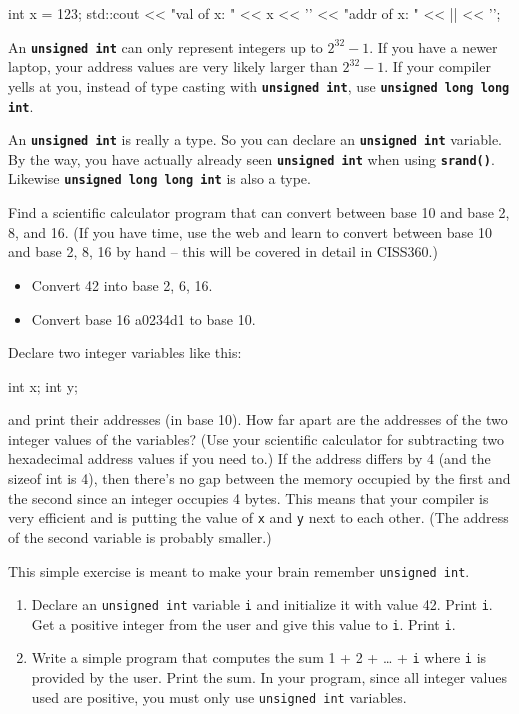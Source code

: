 \begin{consolethree}[escapeinside=||]
int x = 123;
std::cout << "val of x: " << x
          << '\n' << "addr of x: "
          << ||
          << '\n';
\end{consolethree}
An \texttt{\textbf{unsigned int}} can only represent integers up to $2^{32} - 1$. If you have a newer laptop, your address values are very likely larger than $2^{32} - 1$. If your compiler yells at you, instead of type casting with \texttt{\textbf{unsigned int}}, use \texttt{\textbf{unsigned long long int}}.

An \texttt{\textbf{unsigned int}} is really a type. So you can declare an \texttt{\textbf{unsigned int}} variable. By the way, you have actually already seen \texttt{\textbf{unsigned int}} when using \texttt{\textbf{srand()}}. Likewise \texttt{\textbf{unsigned long long int}} is also a type.

\begin{ex} Find a scientific calculator program that can convert between base 10 and base 2, 8, and 16. (If you have time, use the web and learn to convert between base 10 and base 2, 8, 16 by hand -- this will be covered in detail in CISS360.)
\begin{itemize}
\item
  Convert 42 into base 2, 6, 16.
\item
  Convert base 16 a0234d1 to base 10.
\end{itemize}
\end{ex}

\begin{ex}
Declare two integer variables like this:
\begin{consolethree}[escapeinside=||]
int x;
int y;
\end{consolethree}
and print their addresses (in base 10). How far apart are the addresses of the two integer values of the variables? (Use your scientific calculator for subtracting two hexadecimal address values if you need to.) If the address differs by 4 (and the sizeof int is 4), then there's no gap between the memory occupied by the first and the second since an integer occupies 4 bytes. This means that your compiler is very efficient and is putting the value of \texttt{x} and \texttt{y} next to each other. (The address of the second variable is probably smaller.)
\end{ex}
\begin{ex}
This simple exercise is meant to make your brain remember \texttt{unsigned int}.

\begin{enumerate}
\item
  Declare an \texttt{unsigned int} variable \texttt{i} and initialize it
  with value 42. Print \texttt{i}. Get a positive integer from the user
  and give this value to \texttt{i}. Print \texttt{i}.
\item
  Write a simple program that computes the sum 1 + 2 + \ldots{} +
  \texttt{i} where \texttt{i} is provided by the user. Print the sum. In
  your program, since all integer values used are positive, you must
  only use \texttt{unsigned int} variables.
\end{enumerate}
\end{ex}

